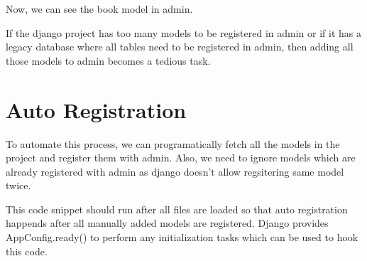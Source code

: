 \documentclass[letterpaper,12pt,english]{sphinxmanual}
\begin{document}
Now, we can see the book model in admin.


If the django project has too many models to be registered in admin or if it has a legacy database where all tables need to be registered in admin, then adding all those models to admin becomes a tedious task.


\section{Auto Registration}
\label{\detokenize{admin_auto_register_models:auto-registration}}
To automate this process, we can programatically fetch all the models in the project and register them with admin. Also, we need to ignore models which are already registered with admin as django doesn’t allow regsitering same model twice.

\begin{sphinxVerbatim}[commandchars=\\\{\}]
   


  

   
     
\end{sphinxVerbatim}

This code snippet should run after all  files are loaded so that auto registration happends after all manually added models are registered. Django provides AppConfig.ready() to perform any initialization tasks which can be used to hook this code.
\end{document}
